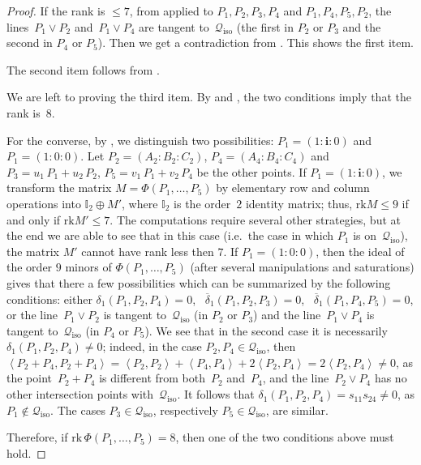 \documentclass{amsart}
\theoremstyle{plain}
\theoremstyle{definition}
\newcommand{\iso}{\mathcal{Q}_{\mathrm{iso}}}
\newcommand{\scl}[2]{\left\langle {#1}, {#2} \right\rangle}
\newcommand{\iii}{\textbf{i}}
\newcommand{\rk}{\ensuremath{\mathrm{rk}}}
\begin{document}
\begin{proof}
If the rank is $\leq 7$, from
 applied to $P_1, P_2, P_3, P_4$ and $P_1, P_4, P_5, P_2$,
the lines~$P_1 \vee P_2$ and~$P_1 \vee P_4$ are tangent to~$\iso$ (the first in $P_2$ or $P_3$ and the second in $P_4$ or $P_5$).
Then we get a contradiction from .
This shows the first item.

The second item follows from .

We are left to proving the third item. By  and , the two conditions imply that the rank is~$8$.

For the converse, by , we distinguish two possibilities:
$P_1 = (1:\iii :0)$ and
$P_1 = (1: 0: 0)$.
Let $P_2 = (A_2: B_2: C_2)$, $P_4 = (A_4: B_4: C_4)$ and
$P_3 = u_1 \, P_1 + u_2 \, P_2$, $P_5 = v_1 \, P_1 + v_2 \, P_4$ be the other points.
If $P_1 = (1: \iii: 0)$, we transform the matrix $M = \Phi(P_1, \dots, P_5)$ by elementary row and column operations into $\mathbb{I}_2 \oplus M'$, where $\mathbb{I}_2$ is the order~$2$ identity matrix; thus, $\rk M \leq 9$ if and only if $\rk M' \leq 7$.
The computations require several other strategies, but at the end we are
able to see that in this case (i.e.\ the case in which $P_1$ is on~$\iso$), the matrix $M'$ cannot have rank less then $7$.
If $P_1 = (1: 0: 0)$, then the ideal of the order $9$ minors of
$\Phi(P_1, \dots, P_5)$ (after several manipulations and saturations)
gives that there a few possibilities which can be summarized by the
following conditions: either $\delta_1(P_1, P_2, P_4) = 0$,
\ $\overline{\delta}_1(P_1, P_2, P_3) = 0$,
\ $\overline{\delta}_1(P_1, P_4, P_5) = 0$, or the line~$P_1 \vee P_2$ is tangent to~$\iso$ (in $P_2$ or $P_3$) and the line~$P_1 \vee P_4$ is tangent to~$\iso$ (in $P_4$ or $P_5$). We see that in the second case it is necessarily $\delta_1(P_1,P_2,P_4)
\neq 0$; indeed, in the case $P_2, P_4 \in \iso$, then $\scl{P_2 +P_4}{P_2+P_4}= \scl{P_2}{P_2} + \scl{P_4}{P_4}+2\scl{P_2}{P_4} =2\scl{P_2}{P_4} \neq 0$, as
the point~$P_2 + P_4$ is different from both~$P_2$ and~$P_4$, and the line~$P_2 \vee P_4$ has no other intersection points with~$\iso$. It follows that
$\delta_1 (P_1,P_2,P_4)=s_{11}s_{24} \neq 0$, as $P_1 \not\in \iso$. The cases $P_3 \in \iso$, respectively $P_5\in \iso$, are similar.

Therefore, if $\rk \, \Phi(P_1, \dots, P_5) = 8$, then one of the two conditions above must hold.
\end{proof}
\end{document}
